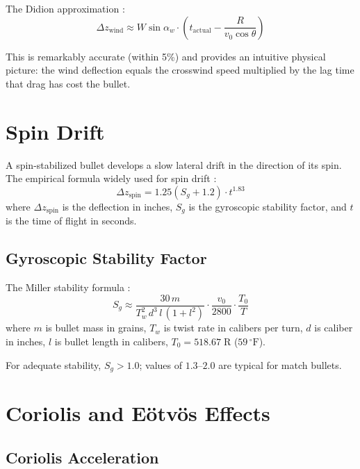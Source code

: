 \documentclass[11pt,twoside,openright]{report}
\newcommand{\degF}{{}^{\circ}\mathrm{F}}
\begin{document}
The Didion approximation \citep{mccoy1999modern, litz2011applied}:
\begin{equation}
  \Delta z_{\mathrm{wind}} \approx W\sin\alpha_w \cdot \left(t_{\mathrm{actual}} - \frac{R}{v_0\cos\theta}\right)
  \label{eq:lag_rule}
\end{equation}

This is remarkably accurate (within 5\%) and provides an intuitive physical picture: the wind deflection equals the crosswind speed multiplied by the lag time that drag has cost the bullet.

\section{Spin Drift}
\label{sec:spin_drift}

A spin-stabilized bullet develops a slow lateral drift in the direction of its spin. The empirical formula widely used for spin drift \citep{litz2011applied}:
\begin{equation}
  \boxed{\Delta z_{\mathrm{spin}} = 1.25\left(S_g + 1.2\right) \cdot t^{1.83}}
  \label{eq:spin_drift}
\end{equation}
where $\Delta z_{\mathrm{spin}}$ is the deflection in inches, $S_g$ is the gyroscopic stability factor, and $t$ is the time of flight in seconds.

\subsection{Gyroscopic Stability Factor}

The Miller stability formula \citep{miller2005twist}:
\begin{equation}
  \boxed{S_g \approx \frac{30\,m}{T_w^2\,d^3\,l\,\left(1 + l^2\right)} \cdot \frac{v_0}{2800} \cdot \frac{T_0}{T}}
  \label{eq:miller_sg}
\end{equation}
where $m$ is bullet mass in grains, $T_w$ is twist rate in calibers per turn, $d$ is caliber in inches, $l$ is bullet length in calibers, $T_0 = 518.67\;\text{R}$ ($59\,\degF$).

For adequate stability, $S_g > 1.0$; values of $1.3$--$2.0$ are typical for match bullets.

\section{Coriolis and E\"otv\"os Effects}
\label{sec:coriolis}

\subsection{Coriolis Acceleration}
\end{document}
